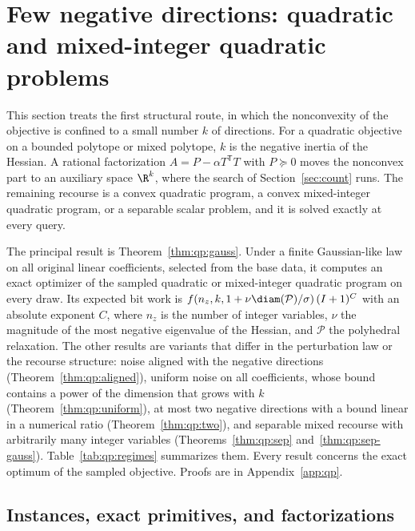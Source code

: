 \section{Few negative directions: quadratic and mixed-integer quadratic problems}\label{sec:qp}

This section treats the first structural route, in which the nonconvexity of
the objective is confined to a small number $k$ of directions. For a
quadratic objective on a bounded polytope or mixed polytope, $k$ is the
negative inertia of the Hessian. A rational factorization
$A=P-\alpha T^{\mathsf T} T$ with $P\succeq0$ moves the nonconvex part to an
auxiliary space $\R^k$, where the search of Section~\ref{sec:count} runs. The
remaining recourse is a convex quadratic program, a convex mixed-integer
quadratic program, or a separable scalar problem, and it is solved exactly at
every query.

The principal result is Theorem~\ref{thm:qp:gauss}. Under a finite
Gaussian-like law on all original linear coefficients, selected from the
base data, it computes an exact optimizer of the sampled quadratic or
mixed-integer quadratic program on every draw. Its expected bit work is
$f(n_z,k,1+\nu\diam(\mathcal P)/\sigma)\,(I+1)^{C}$ with an absolute
exponent $C$, where $n_z$ is the number of integer variables, $\nu$ the
magnitude of the most negative eigenvalue of the Hessian, and $\mathcal P$
the polyhedral relaxation. The
other results are variants that differ in the perturbation law or the
recourse structure: noise aligned with the negative directions
(Theorem~\ref{thm:qp:aligned}), uniform noise on all coefficients, whose
bound contains a power of the dimension that grows with $k$
(Theorem~\ref{thm:qp:uniform}), at most two negative directions with a bound
linear in a numerical ratio (Theorem~\ref{thm:qp:two}), and separable mixed
recourse with arbitrarily many integer variables
(Theorems~\ref{thm:qp:sep} and~\ref{thm:qp:sep-gauss}).
Table~\ref{tab:qp:regimes} summarizes them. Every result concerns the exact
optimum of the sampled objective. Proofs are in Appendix~\ref{app:qp}.

\subsection{Instances, exact primitives, and factorizations}\label{sec:qp:model}

